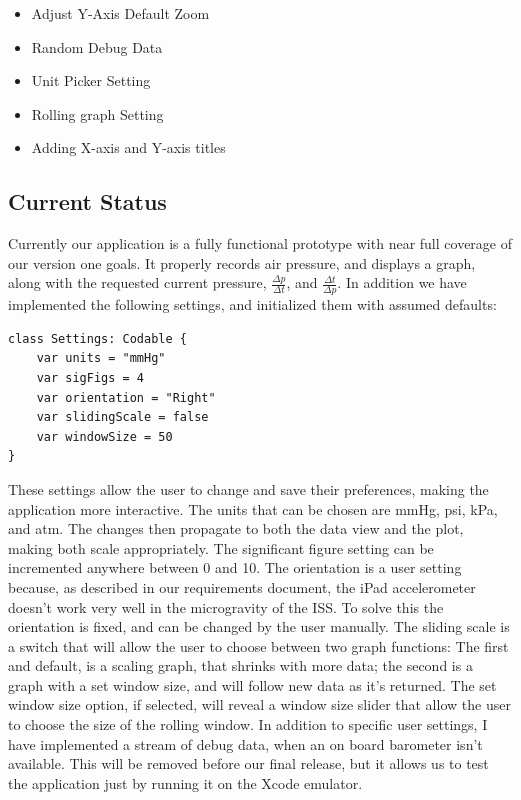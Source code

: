 \documentclass[onecolumn, draftclsnofoot,10pt, compsoc]{IEEEtran}
\begin{document}
\begin{itemize}
  \item Adjust Y-Axis Default Zoom
  \item Random Debug Data
  \item Unit Picker Setting
  \item Rolling graph Setting
  \item Adding X-axis and Y-axis titles
\end{itemize}

\subsection{Current Status}

Currently our application is a fully functional prototype with near full coverage of our version one goals.
It properly records air pressure, and displays a graph, along with the requested current pressure, $\frac{\Delta p}{\Delta t}$, and $\frac{\Delta t}{\Delta p}$.
In addition we have implemented the following settings, and initialized them with assumed defaults:

\begin{lstlisting}
class Settings: Codable {
    var units = "mmHg"
    var sigFigs = 4
    var orientation = "Right"
    var slidingScale = false
    var windowSize = 50
}
\end{lstlisting}

These settings allow the user to change and save their preferences, making the application more interactive.
The units that can be chosen are mmHg, psi, kPa, and atm.
The changes then propagate to both the data view and the plot, making both scale appropriately.
The significant figure setting can be incremented anywhere between 0 and 10.
The orientation is a user setting because, as described in our requirements document, the iPad accelerometer doesn't work very well in the microgravity of the ISS.
To solve this the orientation is fixed, and can be changed by the user manually.
The sliding scale is a switch that will allow the user to choose between two graph functions: The first and default, is a scaling graph, that shrinks with more data; the second is a graph with a set window size, and will follow new data as it's returned.
The set window size option, if selected, will reveal a window size slider that allow the user to choose the size of the rolling window.
In addition to specific user settings, I have implemented a stream of debug data, when an on board barometer isn't available.
This will be removed before our final release, but it allows us to test the application just by running it on the Xcode emulator.
\end{document}

